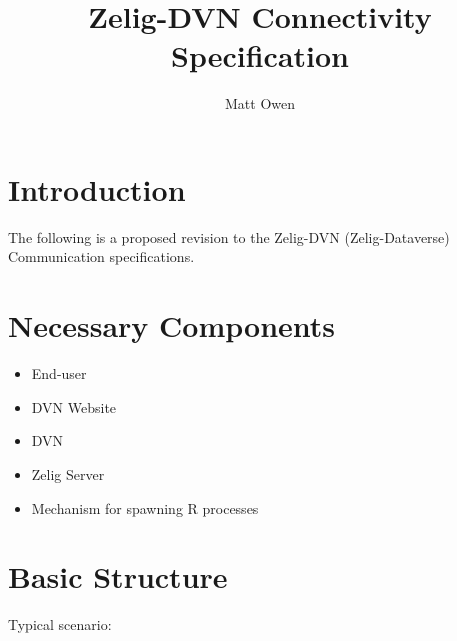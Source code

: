 \documentclass{article}
\title{Zelig-DVN Connectivity Specification}
\author{Matt Owen}
\begin{document}
\maketitle

\section{Introduction}
\label{intro}

The following is a proposed revision to the Zelig-DVN (Zelig-Dataverse) 
Communication specifications. 

\section{Necessary Components}
\label{Necessary-Components}

\begin{itemize}
  \item End-user
  \item DVN Website
  \item DVN
  \item Zelig Server
  \item Mechanism for spawning R processes
\end{itemize}

\section{Basic Structure}
\label{Basic Structure}

Typical scenario:
\end{document}
